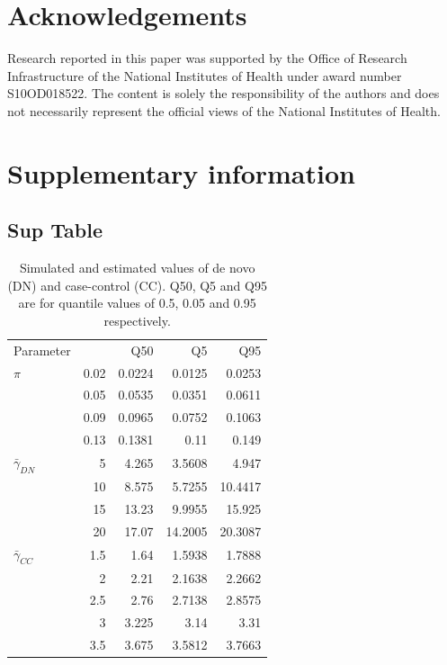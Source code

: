 \documentclass[]{article}
\begin{document}
\section{Acknowledgements}

Research reported in this paper was supported by the Office of Research Infrastructure of the National Institutes of Health under
award number S10OD018522. The content is solely the responsibility of the authors and does not necessarily represent the official views of
the National Institutes of Health.

\section{Supplementary information}

\setcounter{figure}{0}
\renewcommand{\thefigure}{S\arabic{figure}}



\setcounter{table}{0}
\renewcommand{\thetable}{S\arabic{table}}

\subsection{Sup Table}

\begin{table}[H]
\begin{tabular}{l|r|r|r|r}
\hline

Parameter & & Q50 & Q5 & Q95 \\
$\pi$ & 0.02 & 0.0224 & 0.0125 & 0.0253\\
& 0.05 & 0.0535 & 0.0351 & 0.0611\\
& 0.09 & 0.0965 & 0.0752 & 0.1063\\
& 0.13 & 0.1381 & 0.11 & 0.149\\
\hline
$\bar{\gamma}_{DN}$ & 5 & 4.265 & 3.5608 & 4.947\\
& 10 & 8.575 & 5.7255 & 10.4417\\
& 15 & 13.23 & 9.9955 & 15.925\\
& 20 & 17.07 & 14.2005 & 20.3087\\
\hline
$\bar{\gamma}_{CC}$ & 1.5 & 1.64 & 1.5938 & 1.7888\\
& 2 & 2.21 & 2.1638 & 2.2662\\
& 2.5 & 2.76 & 2.7138 & 2.8575\\
& 3 & 3.225 & 3.14 & 3.31\\
& 3.5 & 3.675 & 3.5812 & 3.7663\\
\hline
\end{tabular}
\caption{Simulated and estimated values of de novo (DN) and
  case-control (CC). Q50, Q5 and Q95 are for quantile values of 0.5,
  0.05 and 0.95 respectively.}
\label{tab:SimulatedParameterOfDNandCC}
\end{table}
\end{document}
